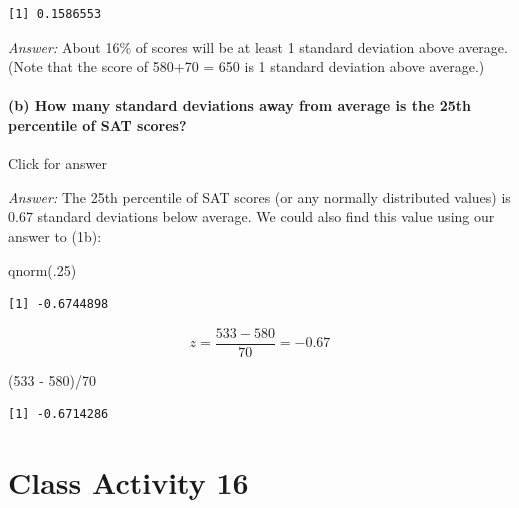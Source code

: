 \documentclass[
]{book}
\newenvironment{Shaded}{\begin{snugshade}}{\end{snugshade}}
\newcommand{\DecValTok}[1]{\textcolor[rgb]{0.00,0.00,0.81}{#1}}
\newcommand{\FunctionTok}[1]{\textcolor[rgb]{0.00,0.00,0.00}{#1}}
\newcommand{\NormalTok}[1]{#1}
\newcommand{\SpecialCharTok}[1]{\textcolor[rgb]{0.00,0.00,0.00}{#1}}
\begin{document}
\begin{verbatim}
[1] 0.1586553
\end{verbatim}

\emph{Answer:} About 16\% of scores will be at least 1 standard deviation above average. (Note that the score of 580+70 = 650 is 1 standard deviation above average.)

\hypertarget{b-how-many-standard-deviations-away-from-average-is-the-25th-percentile-of-sat-scores}{%
\subsubsection{(b) How many standard deviations away from average is the 25th percentile of SAT scores?}\label{b-how-many-standard-deviations-away-from-average-is-the-25th-percentile-of-sat-scores}}

Click for answer

\emph{Answer:} The 25th percentile of SAT scores (or any normally distributed values) is 0.67 standard deviations below average. We could also find this value using our answer to (1b):

\hfill\break

\begin{Shaded}
\begin{Highlighting}[]
\FunctionTok{qnorm}\NormalTok{(.}\DecValTok{25}\NormalTok{)}
\end{Highlighting}
\end{Shaded}

\begin{verbatim}
[1] -0.6744898
\end{verbatim}

\[
z = \dfrac{533 - 580}{70} = -0.67
\]

\begin{Shaded}
\begin{Highlighting}[]
\NormalTok{(}\DecValTok{533} \SpecialCharTok{{-}} \DecValTok{580}\NormalTok{)}\SpecialCharTok{/}\DecValTok{70}
\end{Highlighting}
\end{Shaded}

\begin{verbatim}
[1] -0.6714286
\end{verbatim}

\hypertarget{class-activity-16}{%
\chapter{Class Activity 16}\label{class-activity-16}}
\end{document}
